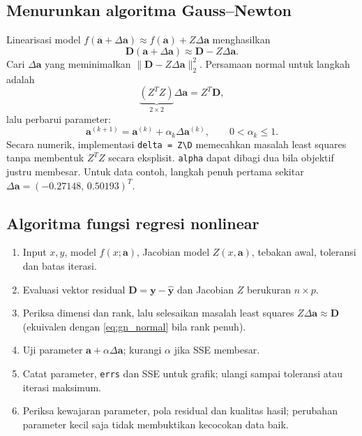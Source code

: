 \subsection{Menurunkan algoritma Gauss--Newton}
Linearisasi model $f(\mathbf{a}+\Delta\mathbf{a})\approx f(\mathbf{a})+Z\Delta\mathbf{a}$ menghasilkan
\begin{equation}
\mathbf{D}(\mathbf{a}+\Delta\mathbf{a})\approx\mathbf{D}-Z\Delta\mathbf{a}.
\end{equation}
Cari $\Delta\mathbf{a}$ yang meminimalkan $\|\mathbf{D}-Z\Delta\mathbf{a}\|_2^2$. Persamaan normal untuk langkah adalah
\begin{equation}
\underbrace{(Z^TZ)}_{2\times2}\Delta\mathbf{a}=Z^T\mathbf{D},
\label{eq:gn_normal}
\end{equation}
lalu perbarui parameter:
\begin{equation}
\mathbf{a}^{(k+1)}=\mathbf{a}^{(k)}+\alpha_k\Delta\mathbf{a}^{(k)},\qquad 0<\alpha_k\le1.
\label{eq:gn_update}
\end{equation}
Secara numerik, implementasi \texttt{delta = Z\textbackslash D} memecahkan masalah least squares tanpa membentuk $Z^TZ$ secara eksplisit. \texttt{alpha} dapat dibagi dua bila objektif justru membesar. Untuk data contoh, langkah penuh pertama sekitar $\Delta\mathbf{a}=(-0.27148,\,0.50193)^T$.

\subsection{Algoritma fungsi regresi nonlinear}
\begin{enumerate}
\item Input $x,y$, model $f(x;\mathbf{a})$, Jacobian model $Z(x,\mathbf{a})$, tebakan awal, toleransi dan batas iterasi.
\item Evaluasi vektor residual $\mathbf{D}=\mathbf{y}-\widehat{\mathbf{y}}$ dan Jacobian $Z$ berukuran $n\times p$.
\item Periksa dimensi dan rank, lalu selesaikan masalah least squares $Z\Delta\mathbf{a}\approx\mathbf{D}$ (ekuivalen dengan \eqref{eq:gn_normal} bila rank penuh).
\item Uji parameter $\mathbf{a}+\alpha\Delta\mathbf{a}$; kurangi $\alpha$ jika SSE membesar.
\item Catat parameter, \texttt{errs} dan SSE untuk grafik; ulangi sampai toleransi atau iterasi maksimum.
\item Periksa kewajaran parameter, pola residual dan kualitas hasil; perubahan parameter kecil saja tidak membuktikan kecocokan data baik.
\end{enumerate}



